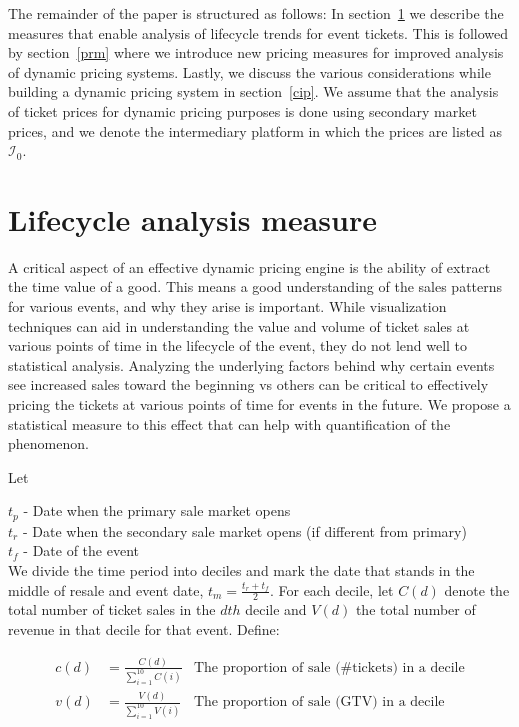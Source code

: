 \documentclass[letterpaper, 12pt]{article}
\begin{document}
The remainder of the paper is structured as follows: In section~\ref{lcm} we describe the measures that enable analysis of lifecycle trends for event tickets. This is followed by section~\ref{prm} where we introduce new pricing measures for improved analysis of dynamic pricing systems. Lastly, we discuss the various considerations while building a dynamic pricing system in section~\ref{cip}. We assume that the analysis of ticket prices for dynamic pricing purposes is done using secondary market prices, and we denote the intermediary platform in which the prices are listed as $\mathcal{I}_0$. 

\section{Lifecycle analysis measure}\label{lcm}
A critical aspect of an effective dynamic pricing engine is the ability of extract the time value of a good. This means a good understanding of the sales patterns for various events, and why they arise is important. While visualization techniques can aid in understanding the value and volume of ticket sales at various points of time in the lifecycle of the event, they do not lend well to statistical analysis. Analyzing the underlying factors behind why certain events see increased sales toward the beginning vs others can be critical to effectively pricing the tickets at various points of time for events in the future. We propose a statistical measure to this effect that can help with quantification of the phenomenon.

\noindent Let

\noindent $t_p$ - Date when the primary sale market opens\\
$t_r$ - Date when the secondary sale market opens (if different from primary)\\
$t_f$ - Date of the event\\ 

We divide the time period into deciles and mark the date that stands in the middle of resale and event date, $t_m = \frac{t_r+t_f}{2}$. For each decile, let $C(d)$ denote the total number of ticket sales in the $dth$ decile and $V(d)$ the total number of revenue in that decile for that event. Define:

\begin{align*}
	c(d) &= \frac{C(d)}{\sum_{i=1}^{10}C(i)}&\text{The proportion of sale (\# tickets) in a decile}\\
	v(d) &= \frac{V(d)}{\sum_{i=1}^{10}V(i)}&\text{The proportion of sale (GTV) in a decile}
\end{align*}
\end{document}
